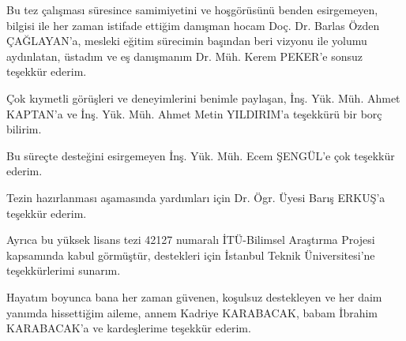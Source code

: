 Bu tez çalışması süresince samimiyetini ve hoşgörüsünü benden esirgemeyen,
bilgisi ile her zaman istifade ettiğim danışman hocam Doç. Dr. Barlas
Özden ÇAĞLAYAN’a, mesleki eğitim sürecimin başından beri vizyonu ile
yolumu aydınlatan, üstadım ve eş danışmanım Dr. Müh. Kerem PEKER’e
sonsuz teşekkür ederim.

Çok kıymetli görüşleri ve deneyimlerini benimle paylaşan, İnş. Yük.
Müh. Ahmet KAPTAN’a ve İnş. Yük. Müh. Ahmet Metin YILDIRIM’a teşekkürü
bir borç bilirim.

Bu süreçte desteğini esirgemeyen İnş. Yük. Müh. Ecem ŞENGÜL’e çok
teşekkür ederim.

Tezin hazırlanması aşamasında yardımları için Dr. Ögr. Üyesi Barış
ERKUŞ’a teşekkür ederim.

Ayrıca bu yüksek lisans tezi 42127 numaralı İTÜ-Bilimsel Araştırma
Projesi kapsamında kabul görmüştür, destekleri için İstanbul Teknik
Üniversitesi’ne teşekkürlerimi sunarım.

Hayatım boyunca bana her zaman güvenen, koşulsuz destekleyen ve her
daim yanımda hissettiğim aileme, annem Kadriye KARABACAK, babam İbrahim
KARABACAK’a ve kardeşlerime teşekkür ederim.
